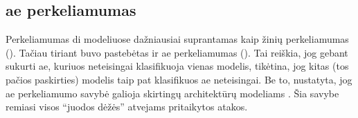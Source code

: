 \subsection{\acs{ae} perkeliamumas}\label{sec:literature:transfer}
Perkeliamumas \acs{di} modeliuose dažniausiai suprantamas kaip žinių perkeliamumas (). Tačiau tiriant  buvo pastebėtas ir \acs{ae} perkeliamumas (). Tai reiškia, jog gebant sukurti \acs{ae}, kuriuos neteisingai klasifikuoja vienas modelis, tikėtina, jog kitas (tos pačios paskirties) modelis taip pat klasifikuos \acs{ae} neteisingai. Be to, nustatyta, jog \acs{ae} perkeliamumo savybė galioja skirtingų architektūrų modeliams \cite{demetrioAdversarialEXEmplesSurvey2021}. Šia savybe remiasi visos \enquote{juodos dėžės} atvejams pritaikytos atakos.
